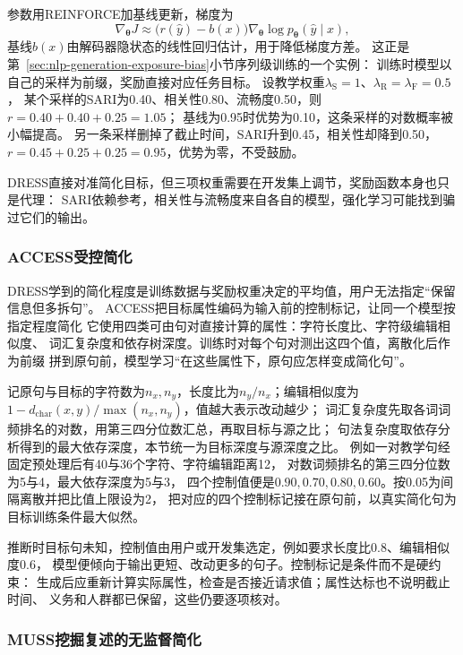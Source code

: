 参数用REINFORCE加基线更新，梯度为
\[
  \nabla_{\bm\theta}J\approx\bigl(r(\hat y)-b(x)\bigr)\nabla_{\bm\theta}\log p_{\bm\theta}(\hat y\mid x),
\]
基线$b(x)$由解码器隐状态的线性回归估计，用于降低梯度方差。
这正是第~\ref{sec:nlp-generation-exposure-bias}小节序列级训练的一个实例：
训练时模型以自己的采样为前缀，奖励直接对应任务目标。
设教学权重$\lambda_{\mathrm{S}}=1$、$\lambda_{\mathrm{R}}=\lambda_{\mathrm{F}}=0.5$，
某个采样的SARI为0.40、相关性0.80、流畅度0.50，则$r=0.40+0.40+0.25=1.05$；
基线为0.95时优势为0.10，这条采样的对数概率被小幅提高。
另一条采样删掉了截止时间，SARI升到0.45，相关性却降到0.50，
$r=0.45+0.25+0.25=0.95$，优势为零，不受鼓励。

DRESS直接对准简化目标，但三项权重需要在开发集上调节，奖励函数本身也只是代理：
SARI依赖参考，相关性与流畅度来自各自的模型，强化学习可能找到骗过它们的输出。

\subsubsection{ACCESS受控简化}
\label{sec:nlp-generation-access}

DRESS学到的简化程度是训练数据与奖励权重决定的平均值，用户无法指定“保留信息但多拆句”。
ACCESS把目标属性编码为输入前的控制标记，让同一个模型按指定程度简化
它使用四类可由句对直接计算的属性：字符长度比、字符级编辑相似度、
词汇复杂度和依存树深度。训练时对每个句对测出这四个值，离散化后作为前缀
拼到原句前，模型学习“在这些属性下，原句应怎样变成简化句”。

记原句与目标的字符数为$n_x,n_y$，长度比为$n_y/n_x$；编辑相似度为
$1-d_{\mathrm{char}}(x,y)/\max(n_x,n_y)$，值越大表示改动越少；
词汇复杂度先取各词词频排名的对数，用第三四分位数汇总，再取目标与源之比；
句法复杂度取依存分析得到的最大依存深度，本节统一为目标深度与源深度之比。
例如一对教学句经固定预处理后有40与36个字符、字符编辑距离12，
对数词频排名的第三四分位数为5与4，最大依存深度为5与3，
四个控制值便是$0.90,0.70,0.80,0.60$。按0.05为间隔离散并把比值上限设为2，
把对应的四个控制标记接在原句前，以真实简化句为目标训练条件最大似然。

推断时目标句未知，控制值由用户或开发集选定，例如要求长度比0.8、编辑相似度0.6，
模型便倾向于输出更短、改动更多的句子。控制标记是条件而不是硬约束：
生成后应重新计算实际属性，检查是否接近请求值；属性达标也不说明截止时间、
义务和人群都已保留，这些仍要逐项核对。

\subsubsection{MUSS挖掘复述的无监督简化}
\label{sec:nlp-generation-muss}

